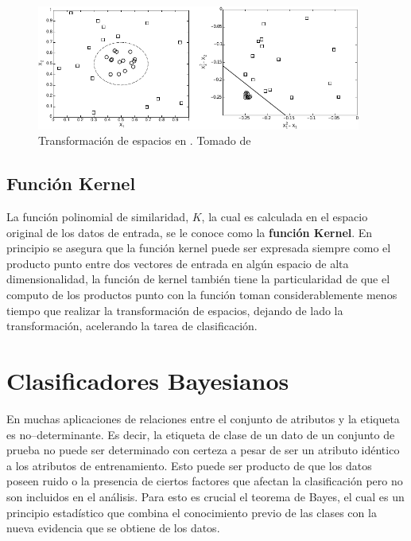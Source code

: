 \begin{figure}[H]
\centering
\includegraphics[width=0.95\textwidth]{Figures/svm-nonlinear-transform.pdf}
\decoRule
\caption[Transformación de espacios en ]{Transformación de espacios en . Tomado de \cite{tan2005introduction}}
\label{fig:svm-nonlinear-transforms}
\end{figure}

\subsection{Función Kernel}
La función polinomial de similaridad, $K$, la cual es calculada en el espacio original de los datos de entrada, se le conoce como la \textbf{función Kernel}. En principio se asegura que la función kernel puede ser expresada siempre como el producto punto entre dos vectores de entrada en algún espacio de alta dimensionalidad, la función de kernel también tiene la particularidad de que el computo de los productos punto con la función toman considerablemente menos tiempo que realizar la transformación de espacios, dejando de lado la transformación, acelerando la tarea de clasificación.


\section{Clasificadores Bayesianos} \label{sec:bayes}
En muchas aplicaciones de relaciones entre el conjunto de atributos y la etiqueta es no--determinante. Es decir, la etiqueta de clase de un dato de un conjunto de prueba no puede ser determinado con certeza a pesar de ser un atributo idéntico a los atributos de entrenamiento. Esto puede ser producto de que los datos poseen ruido o la presencia de ciertos factores que afectan la clasificación pero no son incluidos en el análisis. Para esto es crucial el teorema de Bayes, el cual es un principio estadístico que combina el conocimiento previo de las clases con la nueva evidencia que se obtiene de los datos.

